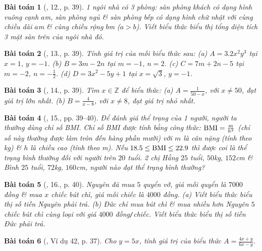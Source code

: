 \documentclass{article}
\newtheorem{baitoan}{Bài toán}
\begin{document}
\begin{baitoan}[\cite{SBT_Toan_7_Canh_Dieu_tap_2}, 12., p. 39]
	1 ngôi nhà có 3 phòng: sàn phòng khách có dạng hình vuông cạnh $a$\emph{m}, sàn phòng ngủ \& sàn phòng bếp có dạng hình chữ nhật với cùng chiều dài $a$\emph{m} \& cùng chiều rộng $b$\emph{m} ($a > b$). Viết biểu thức biểu thị tổng diện tích 3 mặt sàn trên của ngôi nhà đó.
\end{baitoan}

\begin{baitoan}[\cite{SBT_Toan_7_Canh_Dieu_tap_2}, 13., p. 39]
	Tính giá trị của mỗi biểu thức sau: (a) $A = 3.2x^2y^3$ tại $x = 1$, $y = -1$. (b) $B = 3m - 2n$ tại $m = -1$, $n = 2$. (c) $C = 7m + 2n - 5$ tại $m = -2$, $n = -\frac{1}{2}$. (d) $D = 3x^2 - 5y + 1$ tại $x = \sqrt{3}$, $y = -1$.
\end{baitoan}

\begin{baitoan}[\cite{SBT_Toan_7_Canh_Dieu_tap_2}, 14., p. 39]
	Tìm $x\in\mathbb{Z}$ để biểu thức: (a) $A = \frac{1}{50 - x}$, với $x\ne50$, đạt giá trị lớn nhất. (b) $B = \frac{4}{x - 8}$, với $x\ne8$, đạt giá trị nhỏ nhất.
\end{baitoan}

\begin{baitoan}[\cite{SBT_Toan_7_Canh_Dieu_tap_2}, 15., pp. 39--40]
	Để đánh giá thể trạng của 1 người, người ta thường dùng chỉ số BMI. Chỉ số BMI được tính bằng công thức: ${\rm BMI} = \frac{m}{h^2}$ (chỉ số này thường được làm tròn đến hàng phần mười) với $m$ là cân nặng (tính theo \emph{kg}) \& $h$ là chiều cao (tính theo \emph{m}). Nếu $18.5\le{\rm BMI}\le22.9$ thì được coi là thể trạng bình thường đối với người trên $20$ tuổi. 2 chị Hằng $25$ tuổi, $50$\emph{kg}, $152$\emph{cm} \& Bình $25$ tuổi, $72$\emph{kg}, $160$\emph{cm}, người nào đạt thể trạng bình thường?
\end{baitoan}

\begin{baitoan}[\cite{SBT_Toan_7_Canh_Dieu_tap_2}, 16., p. 40]
	Nguyên đã mua $5$ quyển vở, giá mỗi quyển là $7000$ đồng \& mua $x$ chiếc bút chì, giá mỗi chiếc là $4000$ đồng. (a) Viết biểu thức biểu thị số tiền Nguyên phải trả. (b) Đức chỉ mua bút chì \& mua nhiều hơn Nguyên $5$ chiếc bút chì cùng loại với giá $4000$ \emph{đồng\texttt{/}chiếc}. Viết biểu thức biểu thị số tiền Đức phải trả.
\end{baitoan}

\begin{baitoan}[\cite{Tuyen_Toan_7}, Ví dụ 42, p. 37]
	Cho $y = 5x$, tính giá trị của biểu thức $A = \frac{4x + y}{6x - y}$.
\end{baitoan}
\end{document}
